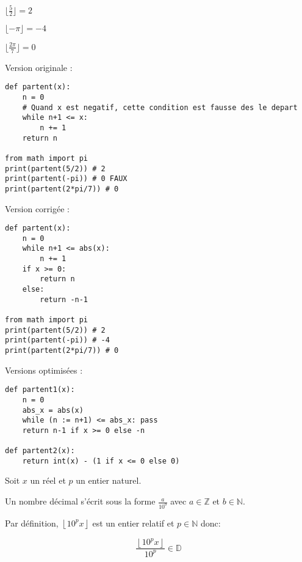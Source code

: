 \documentclass[]{../templates/homework}
\providecommand{\floor}[1]{\left \lfloor #1 \right \rfloor }
\begin{document}

\subproblem

$\lfloor\frac{5}{2}\rfloor = 2$

$\lfloor-\pi\rfloor = -4$

$\lfloor\frac{2\pi}{7}\rfloor = 0$

\hfill

Version originale :
\begin{vscodebox}
\begin{lstlisting}
def partent(x):
	n = 0
	# Quand x est negatif, cette condition est fausse des le depart
	while n+1 <= x:
		n += 1
	return n

from math import pi
print(partent(5/2)) # 2
print(partent(-pi)) # 0 FAUX
print(partent(2*pi/7)) # 0
\end{lstlisting}
\end{vscodebox}

\hfill

Version corrigée :

\begin{vscodebox}
\begin{lstlisting}
def partent(x):
	n = 0
	while n+1 <= abs(x):
		n += 1
	if x >= 0:
		return n
	else:
		return -n-1

from math import pi
print(partent(5/2)) # 2
print(partent(-pi)) # -4
print(partent(2*pi/7)) # 0
\end{lstlisting}
\end{vscodebox}

\hfill

Versions optimisées :

\begin{vscodebox}
\begin{lstlisting}
def partent1(x):
	n = 0
	abs_x = abs(x)
	while (n := n+1) <= abs_x: pass
	return n-1 if x >= 0 else -n

def partent2(x):
	return int(x) - (1 if x <= 0 else 0)
\end{lstlisting}
\end{vscodebox}

\subproblem
\question
Soit $x$ un réel et $p$ un entier naturel.

Un nombre décimal s'écrit sous la forme $\frac{a}{10^b}$ avec $a \in \mathbb{Z}$ et $b \in \mathbb{N}$.

Par définition, $\floor{10^px}$ est un entier relatif et $p \in \mathbb{N}$ donc:

\begin{equation*}
	\frac{\floor{10^px}}{10^p} \in \mathbb{D}
\end{equation*}
\end{document}
